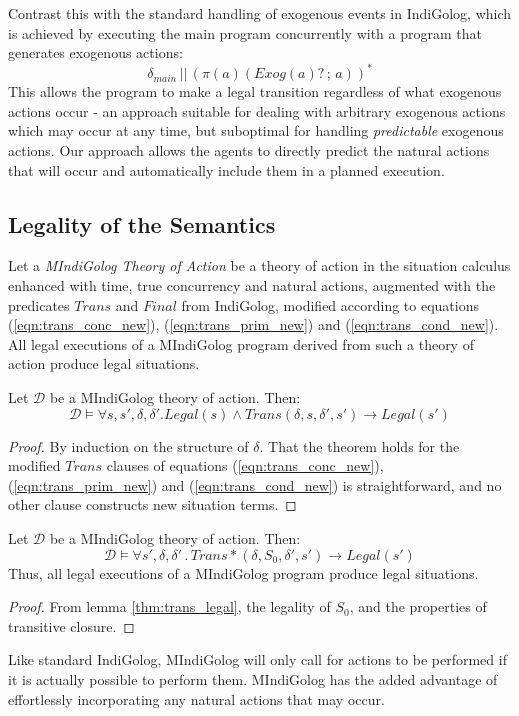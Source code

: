 Contrast this with the standard handling of exogenous events in IndiGolog,
which is achieved by executing the main program concurrently with
a program that generates exogenous actions:\[
\delta_{main}\,||\,\left(\pi(a)(Exog(a)?\,;\, a)\right)^{*}\]
 This allows the program to make a legal transition regardless of
what exogenous actions occur - an approach suitable for dealing with
arbitrary exogenous actions which may occur at any time, but suboptimal
for handling \emph{predictable} exogenous actions. Our approach allows
the agents to directly predict the natural actions that will occur
and automatically include them in a planned execution.


\subsection{Legality of the Semantics}

Let a \emph{MIndiGolog Theory of Action} be a theory of action in
the situation calculus enhanced with time, true concurrency and natural
actions, augmented with the predicates $Trans$ and $Final$ from
IndiGolog, modified according to equations (\ref{eqn:trans_conc_new}),
(\ref{eqn:trans_prim_new}) and (\ref{eqn:trans_cond_new}). All legal
executions of a MIndiGolog program derived from such a theory of action
produce legal situations.

\begin{lemma}
Let $\mathcal{D}$ be a MIndiGolog theory of action. Then:\label{thm:trans_legal}\[
\mathcal{D}\models\forall s,s',\delta,\delta'.Legal(s)\wedge Trans(\delta,s,\delta',s')\rightarrow Legal(s')\]

\end{lemma}
\begin{proof}
By induction on the structure of $\delta$. That the theorem holds
for the modified $Trans$ clauses of equations (\ref{eqn:trans_conc_new}),
(\ref{eqn:trans_prim_new}) and (\ref{eqn:trans_cond_new}) is straightforward,
and no other clause constructs new situation terms. 
\end{proof}
\begin{thm}
Let $\mathcal{D}$ be a MIndiGolog theory of action. Then: \[
\mathcal{D}\models\forall s',\delta,\delta'\,.\, Trans*(\delta,S_{0},\delta',s')\rightarrow Legal(s')\]
 Thus, all legal executions of a MIndiGolog program produce legal
situations. 
\end{thm}
\begin{proof}
From lemma \ref{thm:trans_legal}, the legality of $S_{0}$, and the
properties of transitive closure. 
\end{proof}
Like standard IndiGolog, MIndiGolog will only call for actions to
be performed if it is actually possible to perform them. MIndiGolog
has the added advantage of effortlessly incorporating any natural
actions that may occur.


